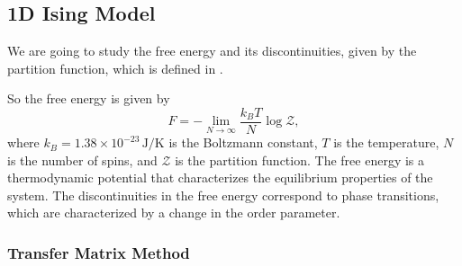 \subsection{1D Ising Model}

We are going to study the free energy and its discontinuities, given by the partition function, which is defined in .

So the free energy is given by
\[
    F = - \lim_{N \to \infty} \frac{k_B T}{N} \log \mathcal{Z},
\]
where \(k_B = 1.38 \times 10^{-23} \, \text{J/K}\) is the Boltzmann constant, \(T\) is the temperature, \(N\) is the number of spins, and \(\mathcal{Z}\) is the partition function. The free energy is a thermodynamic potential that characterizes the equilibrium properties of the system. The discontinuities in the free energy correspond to phase transitions, which are characterized by a change in the order parameter.

\subsubsection{Transfer Matrix Method}

